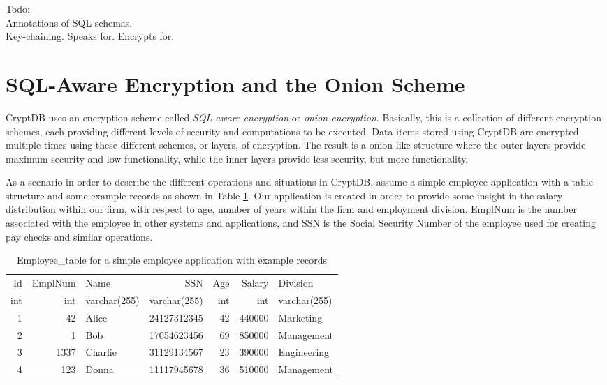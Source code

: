 Todo:\\
Annotations of SQL schemas.\\
Key-chaining. Speaks for. Encrypts for.\\


\section{SQL-Aware Encryption and the Onion Scheme}

CryptDB uses an encryption scheme called \emph{SQL-aware encryption} or \textit{onion encryption}. Basically, this is a collection of different encryption schemes, each providing different levels of security and computations to be executed. Data items stored using CryptDB are encrypted multiple times using these different schemes, or layers, of encryption. The result is a onion-like structure where the outer layers provide maximum security and low functionality, while the inner layers provide less security, but more functionality.

As a scenario in order to describe the different operations and situations in CryptDB, assume a simple employee application with a table structure and some example records as shown in Table \ref{demoapp_table}. Our application is created in order to provide some insight in the salary distribution within our firm, with respect to age, number of years within the firm and employment division. EmplNum is the number associated with the employee in other systems and applications, and SSN is the Social Security Number of the employee used for creating pay checks and similar operations.

\begin{table}[h]
\centering
\begin{tabular}{| r | r | l | r | r | r | l |}
\hline
  Id & EmplNum & Name & SSN & Age & Salary & Division \\
  int & int & varchar(255) & varchar(255) & int & int & varchar(255) \\
 \hline \hline
 1 & 42 & Alice & 24127312345 & 42 & 440000 & Marketing \\
 2 & 1 & Bob & 17054623456 & 69 & 850000 & Management \\
 3 & 1337 & Charlie & 31129134567 & 23 & 390000 & Engineering \\
 4 & 123 & Donna & 11117945678 & 36 & 510000 & Management \\
 \hline

\end{tabular}
\caption{Employee\_table for a simple employee application with example records}
\label{demoapp_table}
\end{table}


